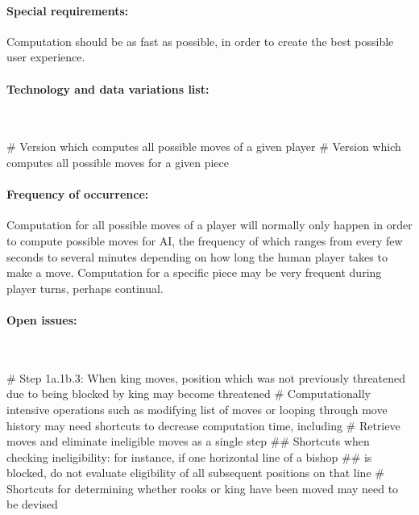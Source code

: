 \documentclass{article}
\begin{document}
\paragraph{Special requirements:} Computation should be as fast as possible, in order to create the best possible user experience. \\

\paragraph{Technology and data variations list:}\mbox{}\\
\begin{easylist}[itemize]
# Version which computes all possible moves of a given player
# Version which computes all possible moves for a given piece
\end{easylist}

\paragraph{Frequency of occurrence:} Computation for all possible moves of a player will normally only happen in order to compute possible moves for AI, the frequency of which ranges from every few seconds to several minutes depending on how long the human player takes to make a move. Computation for a specific piece may be very frequent during player turns, perhaps continual. \\

\paragraph{Open issues:}\mbox{}\\
\begin{easylist}[itemize]
# Step 1a.1b.3: When king moves, position which was not previously threatened due to being blocked by king may become threatened
# Computationally intensive operations such as modifying list of moves or looping through move history may need shortcuts to decrease computation time, including
# Retrieve moves and eliminate ineligible moves as a single step
## Shortcuts when checking ineligibility: for instance, if one horizontal line of a bishop
## is blocked, do not evaluate eligibility of all subsequent positions on that line
# Shortcuts for determining whether rooks or king have been moved may need to be devised
\end{easylist}
\end{document}
